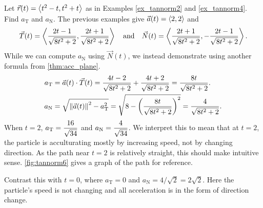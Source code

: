 \begin{example}\label{ex_tannorm6}%
Let $\vec r(t)=\left\langle t^2-t,t^2+t\right\rangle$ as in Examples \ref{ex_tannorm2} and \ref{ex_tannorm4}. Find $a_\mathrm{T}$ and $a_\mathrm{N}$.
\solution
The previous examples give $\vec a(t) =\left\langle 2,2\right\rangle$ and
\[\vec T(t) =\left\langle \frac{2t-1}{\sqrt{8t^2+2}},\frac{2t+1}{\sqrt{8t^2+2}}\right\rangle\quad \text{and}\quad \vec N(t) =\left\langle \frac{2t+1}{\sqrt{8t^2+2}},-\frac{2t-1}{\sqrt{8t^2+2}}\right\rangle.\]
While we can compute $a_\mathrm{N}$ using $\vec N(t)$, we instead demonstrate using another formula from \autoref{thm:acc_plane}.
\begin{align*}
a_\mathrm{T} &= \vat\cdot\vec T(t) = \frac{4t-2}{\sqrt{8t^2+2}}+\frac{4t+2}{\sqrt{8t^2+2}} = \frac{8t}{\sqrt{8t^2+2}}.\\
a_\mathrm{N} &= \sqrt{\norm{\vat}^2-a_\mathrm{T}^2} = \sqrt{8-\left(\frac{8t}{\sqrt{8t^2+2}}\right)^2}=\frac{4}{\sqrt{8t^2+2}}.\medskip
\end{align*}
When $t=2$, $\ds a_{\mathrm{T}} = \frac{16}{\sqrt{34}}%
$ and $\ds a_{\mathrm{N}} = \frac{4}{\sqrt{34}}%
$. We interpret this to mean that at $t=2$, the particle is acculturating mostly by increasing speed, not by changing direction. As the path near $t=2$ is relatively straight, this should make intuitive sense. \autoref{fig:tannorm6} gives a graph of the path for reference.

Contrast this with $t=0$, where $a_{\mathrm{T}}=0$ and $a_{\mathrm{N}}=4/\sqrt2=2\sqrt2 %
$. Here the particle's speed is not changing and all acceleration is in the form of direction change.
\end{example}

